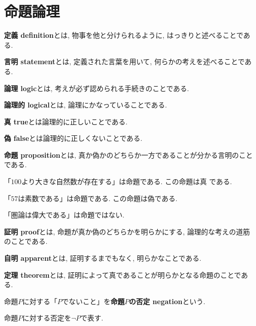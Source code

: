 \section{命題論理}
\begin{mean}
{\bf 定義 definition}とは,
物事を他と分けられるように, はっきりと述べることである.
\end{mean}
\begin{mean}
{\bf 言明 statement}とは, 定義された言葉を用いて, 何らかの考えを述べることである.
\end{mean}
\begin{mean}
{\bf 論理 logic}とは, 考えが必ず認められる手続きのことである.
\end{mean}
\begin{mean}
{\bf 論理的 logical}とは, 論理にかなっていることである.
\end{mean}
\begin{mean}
{\bf 真 true}とは論理的に正しいことである.
\end{mean}
\begin{mean}
{\bf 偽 false}とは論理的に正しくないことである.
\end{mean}
\begin{mean}
{\bf 命題 proposition}とは, 真か偽かのどちらか一方であることが分かる言明のことである.
\end{mean}
\begin{example}
「$100$より大きな自然数が存在する」は命題である. この命題は真
である.
\end{example}
\begin{example}
「$57$は素数である」は命題である. この命題は偽である.
\end{example}
\begin{example}
「圏論は偉大である」は命題ではない.
\end{example}
\begin{mean}
{\bf 証明 proof}とは, 命題が真か偽のどちらかを明らかにする, 論理的な考えの道筋のことである.
\end{mean}
\begin{mean}
{\bf 自明 apparent}とは, 証明するまでもなく, 明らかなことである.
\end{mean}
\begin{mean}
{\bf 定理 theorem}とは, 証明によって真であることが明らかとなる命題のことである.
\end{mean}
\begin{Def}
命題$P$に対する「$P$でないこと」を{\bf 命題$P$の否定 negation}という.
\end{Def}
\begin{Notation}
命題$P$に対する否定を$\lnot P$で表す.
\end{Notation}
